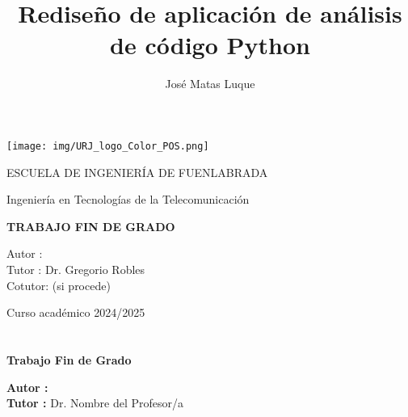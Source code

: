\documentclass[a4paper, 12pt]{book}
\title{Rediseño de aplicación de análisis de código Python}
\author{ José Matas Luque}
\makeatletter
\let\thetitle\@title
\let\theauthor\@author
\makeatother
\begin{document}
\renewcommand{\refname}{Bibliografía}  %
\renewcommand{\appendixname}{Apéndice}



\begin{titlepage}
\begin{center}
\texttt{[image: img/URJ\_logo\_Color\_POS.png]}

\vspace{1.75cm}

\LARGE
ESCUELA DE INGENIERÍA DE FUENLABRADA
\vspace{1cm}

\LARGE
Ingeniería en Tecnologías de la Telecomunicación

\vspace{1cm}
\LARGE
\textbf{TRABAJO FIN DE GRADO}

\vspace{2cm}

\Large
\MakeUppercase{\thetitle}

\vspace{2cm}

\large
Autor : \theauthor \\
Tutor : Dr. Gregorio Robles\\
Cotutor: (si procede)
\vspace{1cm}

\large
Curso académico 2024/2025

\end{center}
\end{titlepage}

\newpage
\mbox{}
\thispagestyle{empty} %



\clearpage
{}
\chapter*{}

\vspace{-4cm}
\begin{center}
\LARGE
\textbf{Trabajo Fin de Grado}

\vspace{1cm}
\large
\thetitle

\vspace{0.8cm}
\large
\textbf{Autor :} \theauthor \\
\textbf{Tutor :} Dr. Nombre del Profesor/a

\end{center}
\end{document}
